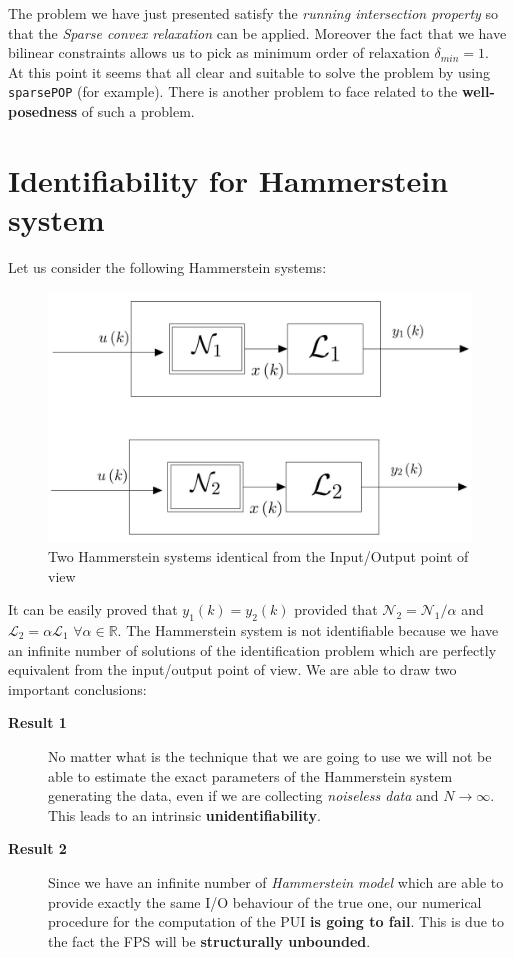 The problem we have just presented satisfy the \textit{running intersection property} so that the \textit{Sparse convex relaxation} can be applied. Moreover the fact that we have bilinear constraints allows us to pick as minimum order of relaxation $\delta_{min}=1$. \\
At this point it seems that all clear and suitable to solve the problem by using \texttt{sparsePOP} (for example). There is another problem to face related to the \textbf{well-posedness} of such a problem.

\section{Identifiability for Hammerstein system}
Let us consider the following Hammerstein systems:
\begin{figure}[h]
    \centering
    \includegraphics[scale=0.2]{img/twohammer.jpg}
    \caption{Two Hammerstein systems identical from the Input/Output point of view}
\end{figure}

\noindent
It can be easily proved that $y_1(k)=y_2(k)$ provided that $\mathcal{N}_2=\mathcal{N}_1/\alpha$ and $\mathcal{L}_2=\alpha\mathcal{L}_{1}$ $\forall\alpha \in \mathbb{R}$. The Hammerstein system is not identifiable because we have an infinite number of solutions of the identification problem which are perfectly equivalent from the input/output point of view. We are able to draw two important conclusions:
\begin{description}
    \item[\textbf{Result 1}] No matter what is the technique that we are going to use we will not be able to estimate the exact parameters of the Hammerstein system generating the data, even if we are collecting \textit{noiseless data} and $N\to\infty$. This leads to an intrinsic \textbf{unidentifiability}.
    \item[\textbf{Result 2}] Since we have an infinite number of \textit{Hammerstein model} which are able to provide exactly the same I/O behaviour of the true one, our numerical procedure for the computation of the PUI \textbf{is going to fail}. This is due to the fact the FPS will be \textbf{structurally unbounded}.
\end{description}

